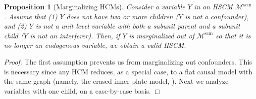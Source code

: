 \documentclass[12pt]{article}
\newtheorem{proposition}{Proposition}
\newcommand{\scm}{\mathrm{scm}}
\begin{document}
\begin{proposition}[Marginalizing HCMs]
	Consider a variable $Y$ in an HSCM $\mathcal{M}^{\scm}$.
	Assume that (1) $Y$ does not have two or more children ($Y$ is not a confounder), and (2) $Y$ is not a unit level variable with both a subunit parent and a subunit child ($Y$ is not an interferer).
	Then, if $Y$ is marginalized out of $\mathcal{M}^{\scm}$ so that it is no longer an endogenous variable, we obtain a valid HSCM.
\end{proposition}
\begin{proof}
The first assumption prevents us from marginalizing out confounders.
This is necessary since any HCM reduces, as a special case, to a flat causal model with the same graph (namely, the erased inner plate model, ).
Next we analyze variables with one child, on a case-by-case basis.


\end{proof}
\end{document}
